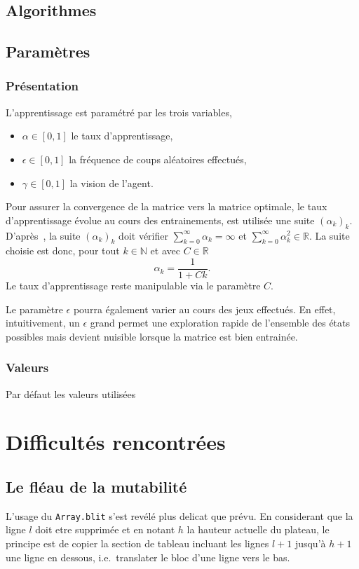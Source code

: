 \documentclass{article}
\newcommand{\R}{\mathbb{R}}
\begin{document}
\subsection{Algorithmes}

\subsection{Param\`etres}
\subsubsection{Pr\'esentation}
L'apprentissage est paramétré par les trois variables,
\begin{itemize}
  \item \(\alpha \in [0, 1]\) le taux d'apprentissage,
  \item \(\epsilon \in [0, 1]\) la fréquence de coups aléatoires effectués,
  \item \(\gamma \in [0, 1]\) la vision de l'agent.
\end{itemize}
Pour assurer la convergence de la matrice vers la matrice optimale,
le taux d'apprentissage évolue au cours des entrainements, est utilisée une
suite \( (\alpha_k)_k \). D'après~\cite{watkins92}, la suite \(
(\alpha_k)_k \) doit vérifier \( \sum_{k=0}^\infty \alpha_k = \infty \) et \(
\sum_{k=0}^\infty \alpha_k^2 \in \R \). La suite choisie est donc, pour tout
\( k \in \mathbb{N} \) et avec \( C \in \R \)
\[
  \alpha_k = \frac{1}{1 + Ck}.
\]
Le taux d'apprentissage reste manipulable via le paramètre \( C \).


Le paramètre \(\epsilon\) pourra \'egalement varier au cours des jeux effectués.
En effet, intuitivement, un \(\epsilon\) grand permet une exploration rapide de
l'ensemble des états possibles mais devient nuisible lorsque la matrice est bien
entrainée.

\subsubsection{Valeurs}
Par défaut les valeurs utilisées


\section{Difficultés rencontrées}

\subsection{Le fl\'eau de la mutabilit\'e}
L'usage du \texttt{Array.blit} s'est revélé plus delicat que prévu. En
considerant que la ligne \(l\) doit etre supprimée et en notant \(h\) la hauteur
actuelle du plateau, le principe est de copier la section de tableau incluant
les lignes \(l+1\) jusqu'à \(h+1\) une ligne en dessous, i.e.\ translater le
bloc d'une ligne vers le bas.
\end{document}
